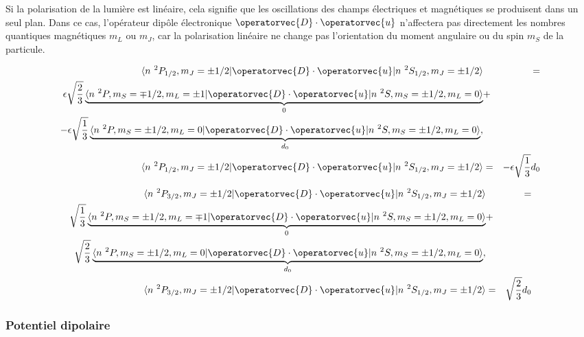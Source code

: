 Si la polarisation de la lumière est linéaire, cela signifie que les oscillations des champs électriques et magnétiques se produisent dans un seul plan. Dans ce cas, l'opérateur dipôle électronique $\operatorvec{D} \cdot \operatorvec{u}$ n'affectera pas directement les nombres quantiques magnétiques $m_L$ ou $m_J$, car la polarisation linéaire ne change pas l'orientation du moment angulaire ou du spin $m_S$ de la particule. 



\begin{eqnarray*}
	\langle n {~}^2P_{1/2} , m_J = \pm  1/2 \vert \operatorvec{D} \cdot \operatorvec{u}\vert n {~}^2S_{1/2} , m_J = \pm  1/2 \rangle	& & =  \\  \epsilon \sqrt{\frac{2}{3}} \underbrace{\langle n {~}^2P , m_S = \mp  1/2  , m_L = \pm 1 \vert \operatorvec{D} \cdot \operatorvec{u}\vert n {~}^2S , m_S = \pm  1/2 , m_L = 0  \rangle}_{0}  & + & \\
	- \epsilon  \sqrt{\frac{1}{3}}\underbrace{\langle n {~}^2P , m_S = \pm  1/2  , m_L = 0 \vert \operatorvec{D} \cdot \operatorvec{u}\vert n {~}^2S , m_S = \pm  1/2 , m_L = 0  \rangle	}_{d_0},\\
	\langle n {~}^2P_{1/2} , m_J = \pm  1/2 \vert \operatorvec{D} \cdot \operatorvec{u}\vert n {~}^2S_{1/2} , m_J = \pm  1/2 \rangle	 &=& - \epsilon \sqrt{\frac{1}{3}} d_0
\end{eqnarray*}

\begin{eqnarray*}
	\langle n {~}^2P_{3/2} , m_J = \pm  1/2 \vert \operatorvec{D} \cdot \operatorvec{u}\vert n {~}^2S_{1/2} , m_J = \pm  1/2 \rangle	& & =  \\  \sqrt{\frac{1}{3}} \underbrace{\langle n {~}^2P , m_S = \pm  1/2  , m_L = \mp 1 \vert \operatorvec{D} \cdot \operatorvec{u}\vert n {~}^2S , m_S = \pm  1/2 , m_L = 0  \rangle}_{0}  & + & \\
	 \sqrt{\frac{2}{3}}\underbrace{\langle n {~}^2P , m_S = \pm  1/2  , m_L = 0 \vert \operatorvec{D} \cdot \operatorvec{u}\vert n {~}^2S , m_S = \pm  1/2 , m_L = 0  \rangle	}_{d_0},\\
	\langle n {~}^2P_{3/2} , m_J = \pm  1/2 \vert \operatorvec{D} \cdot \operatorvec{u}\vert n {~}^2S_{1/2} , m_J = \pm  1/2 \rangle	 &=& \sqrt{\frac{2}{3}} d_0
\end{eqnarray*}

\subsubsection{Potentiel dipolaire}


